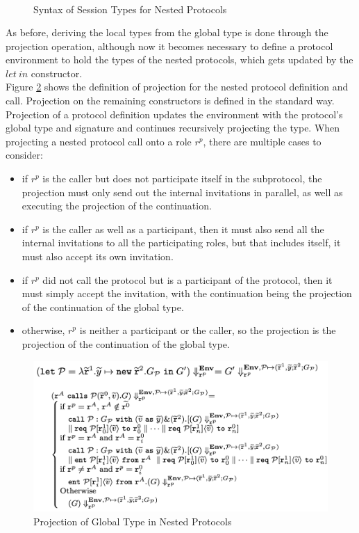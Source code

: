 \documentclass[12pt,twoside]{report}
\begin{document}
\begin{figure}[h]
\begin{equation*}
\begin{array}{rrlr}
        \end{array}
    \end{equation*}
    \caption{Syntax of Session Types for Nested Protocols}
    \label{nested_session_types}
\end{figure}{}

As before, deriving the local types from the global type is done through the projection operation, although now it becomes necessary to define a protocol environment to hold the types of the nested protocols, which gets updated by the $let\ in$ constructor.\\ 

Figure \ref{nested_session_projection} shows the definition of projection for the nested protocol definition and call. Projection on the remaining constructors is defined in the standard way. Projection of a protocol definition updates the environment with the protocol's global type and signature and continues recursively projecting the type. When projecting a nested protocol call onto a role $r^p$, there are multiple cases to consider:
\begin{itemize}
    \item if $r^p$ is the caller but does not participate itself in the subprotocol, the projection must only send out the internal invitations in parallel, as well as executing the projection of the continuation.
    \item if $r^p$ is the caller as well as a participant, then it must also send all the internal invitations to all the participating roles, but that includes itself, it must also accept its own invitation.
    \item if $r^p$ did not call the protocol but is a participant of the protocol, then it must simply accept the invitation, with the continuation being the projection of the continuation of the global type.
    \item otherwise, $r^p$ is neither a participant or the caller, so the projection is the projection of the continuation of the global type.
\end{itemize}

\begin{figure}[h]
    \centering
    \includegraphics[scale=0.45]{nested_session_projection.png}
    \caption{Projection of Global Type in Nested Protocols\cite{nestedprotocols}}
    \label{nested_session_projection}
\end{figure}{}
\end{document}
